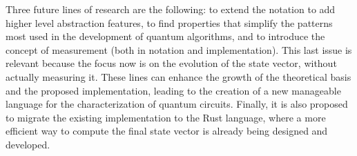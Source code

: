 \documentclass[sigconf,natbib=false]{acmart}
\begin{document}
    Three future lines of  research are the following: to extend the notation to add higher level abstraction features, to find properties that simplify the patterns most used in the development of quantum algorithms, and to introduce the concept of measurement (both in notation and implementation).    
This last issue is relevant because the focus now is on the evolution of the state vector, without actually measuring it.  These lines can enhance the growth of the theoretical basis and the proposed implementation, leading to the creation of a new manageable language for the characterization of quantum circuits. Finally, it is also proposed to migrate the existing implementation to the Rust language, where a more efficient way to compute the final state vector is already being designed and developed.
    
	\printbibliography
\end{document}
